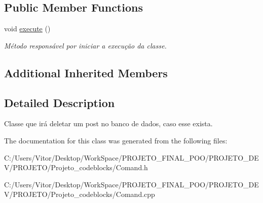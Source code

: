\subsection*{Public Member Functions}
\begin{DoxyCompactItemize}
\item 
\hypertarget{class_command_delete_post_af93e629833de0fa3415294802258d243}{void \hyperlink{class_command_delete_post_af93e629833de0fa3415294802258d243}{execute} ()}\label{class_command_delete_post_af93e629833de0fa3415294802258d243}

\begin{DoxyCompactList}\small\item\em Método responsável por iniciar a execução da classe. \end{DoxyCompactList}\end{DoxyCompactItemize}
\subsection*{Additional Inherited Members}


\subsection{Detailed Description}
Classe que irá deletar um post no banco de dados, caso esse exista. 

The documentation for this class was generated from the following files\-:\begin{DoxyCompactItemize}
\item 
C\-:/\-Users/\-Vitor/\-Desktop/\-Work\-Space/\-P\-R\-O\-J\-E\-T\-O\-\_\-\-F\-I\-N\-A\-L\-\_\-\-P\-O\-O/\-P\-R\-O\-J\-E\-T\-O\-\_\-\-D\-E\-V/\-P\-R\-O\-J\-E\-T\-O/\-Projeto\-\_\-codeblocks/Comand.\-h\item 
C\-:/\-Users/\-Vitor/\-Desktop/\-Work\-Space/\-P\-R\-O\-J\-E\-T\-O\-\_\-\-F\-I\-N\-A\-L\-\_\-\-P\-O\-O/\-P\-R\-O\-J\-E\-T\-O\-\_\-\-D\-E\-V/\-P\-R\-O\-J\-E\-T\-O/\-Projeto\-\_\-codeblocks/Comand.\-cpp\end{DoxyCompactItemize}
